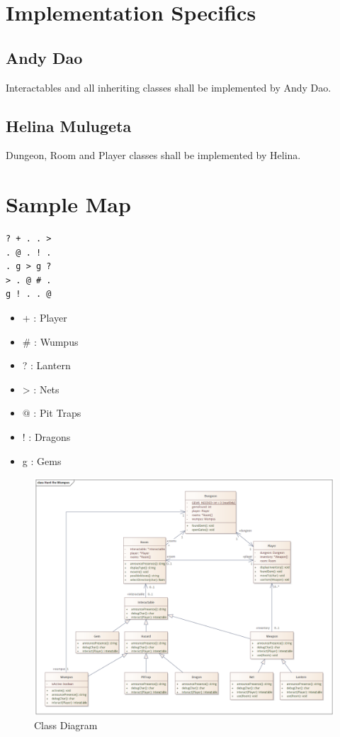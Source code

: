 \documentclass{formalLabReport} %
\begin{document}
\newpage

\section{Implementation Specifics}
\subsection{Andy Dao}

Interactables and all inheriting classes shall be implemented by Andy Dao.

\subsection{Helina Mulugeta}

Dungeon, Room and Player classes shall be implemented by Helina.\newline

\section{Sample Map}

\begin{verbatim}
? + . . >
. @ . ! .
. g > g ?
> . @ # .
g ! . . @
\end{verbatim}

\begin{itemize}
    \item + : Player
    \item \# : Wumpus
    \item ? : Lantern
    \item > : Nets
    \item $@$ : Pit Traps
    \item ! : Dragons
    \item g : Gems
\end{itemize}

\begin{figure}
    \centering
    \includegraphics[width=1\linewidth]{Class Diagram.png}
    \caption{Class Diagram}
    \label{fig:enter-label}
\end{figure}
\end{document}

